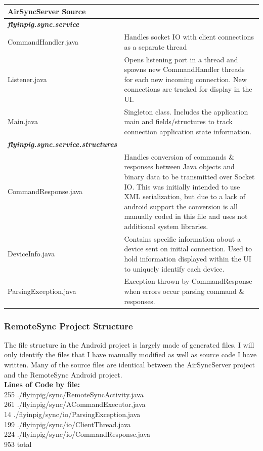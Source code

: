 \documentclass[12pt]{article}
\begin{document}
\begin{center}
\begin{tabular}{|l|p{7.5cm}|}
\hline
	\textbf{AirSyncServer Source} \\
\hline
	\emph{\textbf{flyinpig.sync.service}}\\
\hline 
	CommandHandler.java
	& Handles socket IO with client connections as a separate thread\\
\hline
	Listener.java
	& Opens listening port in a thread and spawns new CommandHandler threads for each new incoming connection. New connections are tracked for display in the UI.\\
\hline
	Main.java
	& Singleton class. Includes the application main and fields/structures to track connection application state information.\\
\hline
	\emph{\textbf{flyinpig.sync.service.structures}}\\
\hline
	CommandResponse.java
	& Handles conversion of commands \& responses between Java objects and binary data to be transmitted over Socket IO. This was initially intended to use XML serialization, but due to a lack of android support the conversion is all manually coded in this file and uses not additional system libraries.\\
\hline
	DeviceInfo.java
	& Contains specific information about a device sent on initial connection. Used to hold information displayed within the UI to uniquely identify each device.\\
\hline
	ParsingException.java
	& Exception thrown by CommandResponse when errors occur parsing command \& responses.\\
\hline
\end{tabular}
\end{center}


\subsubsection{RemoteSync Project Structure}

The file structure in the Android project is largely made of generated files. I will only identify the files that I have manually modified as well as source code I have written. Many of the source files are identical between the AirSyncServer project and the RemoteSync Android project.\\

\textbf{Lines of Code by file:}\\
  255 ./flyinpig/sync/RemoteSyncActivity.java\\
  261 ./flyinpig/sync/ACommandExecutor.java\\
   14 ./flyinpig/sync/io/ParsingException.java\\
  199 ./flyinpig/sync/io/ClientThread.java\\
  224 ./flyinpig/sync/io/CommandResponse.java\\
  953 total
\end{document}

